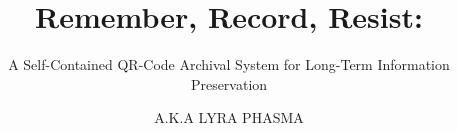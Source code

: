 \documentclass[12pt]{thesis} %
\title{Remember, Record, Resist:}     %
\subtitle{A Self-Contained QR-Code Archival System for Long-Term Information Preservation}
\author{A.K.A LYRA PHASMA}                           %
\begin{document}



\frontmatter

\begin{romanpages}          %
\maketitle                  %
\tableofcontents            %
\listoffigures              %
\listoftables				%
\end{romanpages}            %

% 
% 

\mainmatter







\appendix

% 

% 

% 

\printbibliography

\appendix

\backmatter

\printglossary
\end{document}
